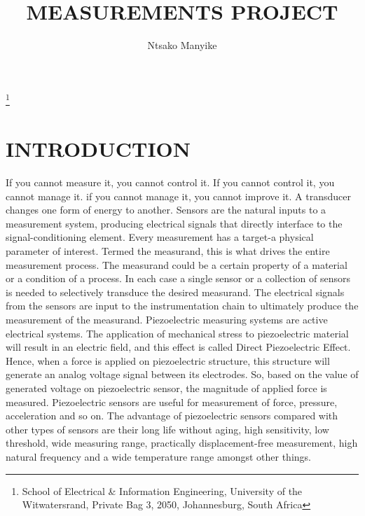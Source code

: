 \documentclass[10pt,twocolumn]{witseiepaper}
\begin{document}
\title{MEASUREMENTS PROJECT}

\author{Ntsako Manyike}

\thanks{School of Electrical \& Information Engineering, University of the
Witwatersrand, Private Bag 3, 2050, Johannesburg, South Africa}



%
\abstract{}



\maketitle
\thispagestyle{empty}\pagestyle{empty}


%
\section{INTRODUCTION}

If you cannot measure it, you cannot control it. If you cannot control it, you cannot manage it. if you cannot manage it, you cannot improve it.
A transducer changes one form of energy to another. Sensors are the natural inputs to a measurement system, producing electrical signals that directly interface to the signal-conditioning element. Every measurement has a target-a physical parameter of interest. Termed the measurand, this is what drives the entire measurement process. The measurand could be a certain property of a material or a condition of a process.   In each case a single sensor or a collection of sensors is needed to selectively transduce the desired measurand. The electrical signals from the sensors are input to the instrumentation chain to ultimately produce the measurement of the measurand.
Piezoelectric measuring systems are active electrical systems. The application of mechanical stress to piezoelectric material will result in an electric field, and this effect is called Direct Piezoelectric Effect. Hence, when a force is applied on piezoelectric structure, this structure will generate an analog voltage signal between its electrodes. So, based on the value of generated voltage on piezoelectric sensor, the magnitude of applied force is measured.
Piezoelectric sensors are useful for measurement of force, pressure, acceleration and so on. The advantage of piezoelectric sensors compared with other types of sensors are their long life without aging, high sensitivity, low threshold, wide measuring range, practically displacement-free measurement, high natural frequency and a wide temperature range amongst other things.
\end{document}
